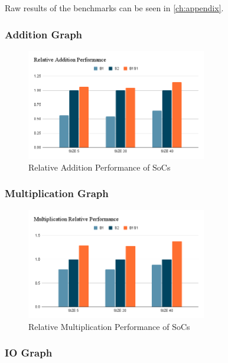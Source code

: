 Raw results of the benchmarks can be seen in \ref{ch:appendix}.

\subsubsection{Addition Graph}

\begin{figure}[H]
    \centering
    \includegraphics[width=0.7\textwidth]{img/Relative Addition Performance.png}
    \caption{Relative Addition Performance of SoCs}
    \label{fig:add_relative_graph}
\end{figure}

\subsubsection{Multiplication Graph}

\begin{figure}[H]
    \centering
    \includegraphics[width=0.7\textwidth]{img/Multiplication Relative Performance.png}
    \caption{Relative Multiplication Performance of SoCs}
    \label{fig:mul_relative_graph}
\end{figure}

\subsubsection{IO Graph}

